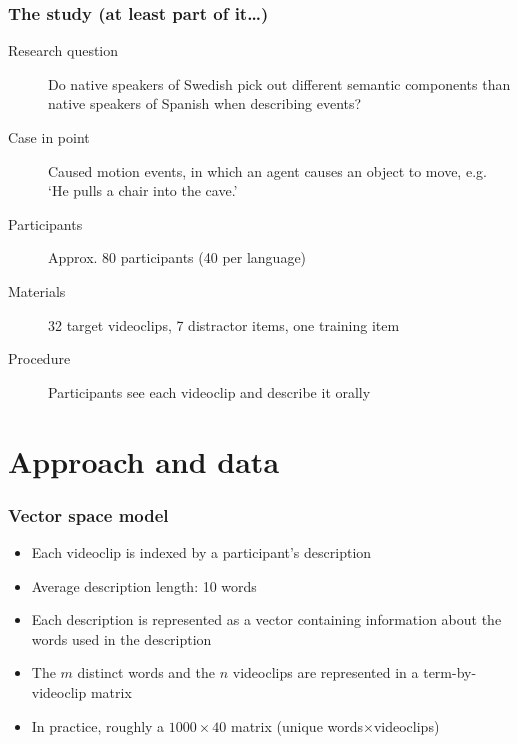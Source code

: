 \documentclass[]{beamer}
\begin{document}
\begin{frame}
	\frametitle{The study (at least part of it\ldots)}
	\begin{description}
		\item[Research question] Do native speakers of Swedish pick out different semantic components than native speakers of Spanish when describing events?\pause
		\item[Case in point] Caused motion events, in which an agent causes an object to move, e.g. `He pulls a chair into the cave.' 
		\item[Participants] Approx. 80 participants (40 per language)
		\item[Materials] 32 target videoclips, 7 distractor items, one training item
		\item[Procedure] Participants see each videoclip and describe it orally
	\end{description}
\end{frame}


\section{Approach and data}

\begin{frame}
	\frametitle{Vector space model}
	\begin{itemize}
		\item Each videoclip is indexed by a participant's description
		\item Average description length: 10 words
		\item Each description is represented as a vector containing information about the words used in the description
		\item The $m$ distinct words and the $n$ videoclips are represented in a term-by-videoclip matrix
		\item In practice, roughly a $1000 \times 40$ matrix (unique words$\times$videoclips)
	\end{itemize}
\end{frame}
\end{document}
